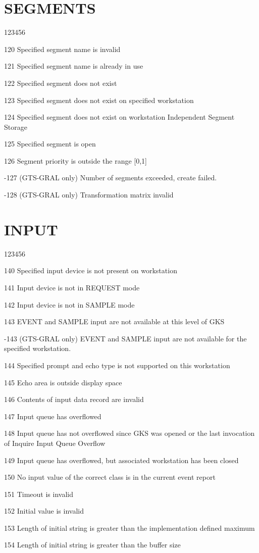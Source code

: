 \section{SEGMENTS}
\begin{DLtt}{123456}
\item[120]
Specified segment name is invalid
\item[121]
Specified segment name is already in use
\item[122]
Specified segment does not exist
\item[123]
Specified segment does not exist on specified workstation
\item[124]
Specified segment does not exist on workstation Independent Segment
Storage
\item[125]
Specified segment is open
\item[126]
Segment priority is outside the range [0,1]
\item[-127]
(GTS-GRAL only) Number of segments exceeded, create failed.
\item[-128]
(GTS-GRAL only) Transformation matrix invalid
\end{DLtt}
\section{INPUT}
\begin{DLtt}{123456}
\item[140]
Specified input device is not present on workstation
\item[141]
Input device is not in REQUEST mode
\item[142]
Input device is not in SAMPLE mode
\item[143]
EVENT and SAMPLE input are not available at this level of GKS
\item[-143]
(GTS-GRAL only) EVENT and SAMPLE input are not available for the specified
workstation.
\item[144]
Specified prompt and echo type is not supported on this workstation
\item[145]
Echo area is outside display space
\item[146]
Contents of input data record are invalid
\item[147]
Input queue has overflowed
\item[148]
Input queue has not overflowed since GKS was opened or the last invocation
of Inquire Input Queue Overflow
\item[149]
Input queue has overflowed, but associated workstation has been closed
\item[150]
No input value of the correct class is in the current event report
\item[151]
Timeout is invalid
\item[152]
Initial value is invalid
\item[153]
Length of initial string is greater than the implementation defined
maximum
\item[154]
Length of initial string is greater than the buffer size
\end{DLtt}
